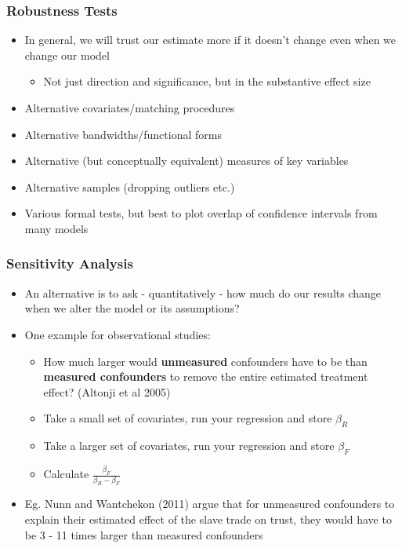 \documentclass[xcolor=x11names,compress]{beamer}\usepackage[]{graphicx}\usepackage[]{color}
\renewcommand{\(}{\begin{columns}}
\renewcommand{\)}{\end{columns}}
\newcommand{\<}[1]{\begin{column}{#1}}
\renewcommand{\>}{\end{column}}
\begin{document}
\begin{frame}
\frametitle{Robustness Tests}
\begin{itemize}
\item In general, we will trust our estimate more if it doesn't change even when we change our model
\begin{itemize}
\item Not just direction and significance, but in the substantive effect size
\end{itemize}
\item Alternative covariates/matching procedures
\pause
\item Alternative bandwidths/functional forms
\pause
\item Alternative (but conceptually equivalent) measures of key variables
\pause
\item Alternative samples (dropping outliers etc.)
\pause
\item Various formal tests, but best to plot overlap of confidence intervals from many models
\end{itemize}
\end{frame}

\begin{frame}
\frametitle{Sensitivity Analysis}
\begin{itemize}
\item An alternative is to ask - quantitatively - how much do our results change when we alter the model or its assumptions?
\pause
\item One example for observational studies:
\begin{itemize}
\item How much larger would \textbf{unmeasured} confounders have to be than \textbf{measured confounders} to remove the entire estimated treatment effect? (Altonji et al 2005)
\pause
\item Take a small set of covariates, run your regression and store $\beta_R$
\pause
\item Take a larger set of covariates, run your regression and store $\beta_F$ 
\pause
\item Calculate $\frac{\beta_F}{\beta_R - \beta_F}$
\end{itemize}
\item Eg. Nunn and Wantchekon (2011) argue that for unmeasured confounders to explain their estimated effect of the slave trade on trust, they would have to be 3 - 11 times larger than measured confounders
\end{itemize}
\end{frame}
\end{document}
